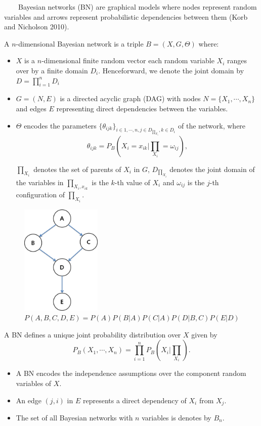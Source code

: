 ~~~~Bayesian networks (BN) are graphical models where nodes represent random variables and arrows represent probabilistic dependencies
between them (Korb and Nicholson 2010).

A $n$-dimensional Bayesian network is a triple $B = (X, G, \Theta)$ where:

\begin{itemize}
	\item $X$ is a $n$-dimensional finite random vector each random variable $X_{i}$ ranges over by a finite domain $D_{i}$. Henceforward, we denote the joint domain by $D=\prod_{i=1}^{n}D_{i}$
	
	\item $G = (N, E)$ is a directed acyclic graph (DAG) with nodes $N = \{X_{1}, \cdots, X_{n}\}$ and edges $E$ representing direct dependencies between the variables.
	
	\item $\Theta$ encodes the parameters $\{\theta_{ijk}\}_{i\in1,\cdots,n,j\in D_{\prod_{X_{i}}},k\in D_{i}}$ of the network, where
	$$\theta_{ijk}=P_{B}(X_{i}=x_{ik}|\prod_{X_{i}}=\omega_{ij}),$$
	
	$\prod_{X_{i}}$ denotes the set of parents of $X_{i}$ in $G$, $D_{\prod_{X_{i}}}$ denotes the joint domain of the variables in $\prod_{X_{i}, x_{ik}}$ is the $k$-th value of $X_{i}$ and $\omega_{ij}$ is the $j$-th configuration of $\prod_{X_{i}}$.
\end{itemize}

\begin{figure}[!h]
	\centering
		\includegraphics[height=150pt]{image01}
		\caption{$P(A,B,C,D,E)=P(A)P(B|A)P(C|A)P(D|B,C)P(E|D)$}
\end{figure}	

A BN defines a unique joint probability distribution over $X$ given by
$$P_{B}(X_{1},\cdots,X_{n})=\prod_{i=1}^{n}P_{B}(X_{i}|\prod_{X_{i}}).$$

\begin{itemize}
	\item A BN encodes the independence assumptions over the component random variables of $X$.
	
	\item An edge $(j, i)$ in $E$ represents a direct dependency of $X_{i}$ from $X_{j}$.
	
	\item The set of all Bayesian networks with $n$ variables is denotes by $B_{n}$.
\end{itemize}
